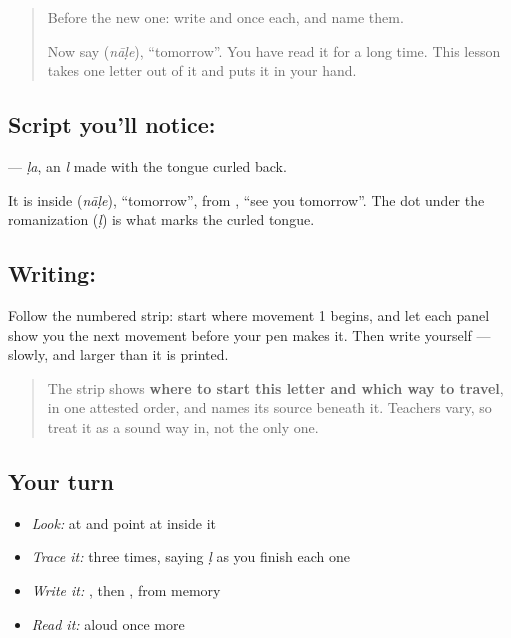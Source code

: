 \label{lesson:ML-W113-lla}



\begin{quote}
Before the new one: write  and  once each, and name them.

Now say \textbf{} (\emph{nāḷe}), \textquotedblleft{}tomorrow\textquotedblright{}. You have read it for a long time. This lesson takes one letter out of it and puts it in your hand.
\end{quote}

\subsection*{Script you'll notice: }
\textbf{} — \emph{ḷa}, an \emph{l} made with the tongue curled back.

It is inside \textbf{} (\emph{nāḷe}), \textquotedblleft{}tomorrow\textquotedblright{}, from \textbf{ }, \textquotedblleft{}see you tomorrow\textquotedblright{}. The dot under the romanization (\emph{ḷ}) is what marks the curled tongue.

\subsection*{Writing: }

Follow the numbered strip: start where movement 1 begins, and let each panel show you the next movement before your pen makes it. Then write  yourself — slowly, and larger than it is printed.

\begin{quote}
The strip shows \textbf{where to start this letter and which way to travel}, in one attested order, and names its source beneath it. Teachers vary, so treat it as a sound way in, not the only one.
\end{quote}

\subsection*{Your turn}
\begin{itemize}
\raggedright
  \item \emph{Look:} at \textbf{} and point at  inside it
  \item \emph{Trace it:}  three times, saying \emph{ḷ} as you finish each one
  \item \emph{Write it:} , then , from memory
  \item \emph{Read it:} \textbf{} aloud once more
\end{itemize}

